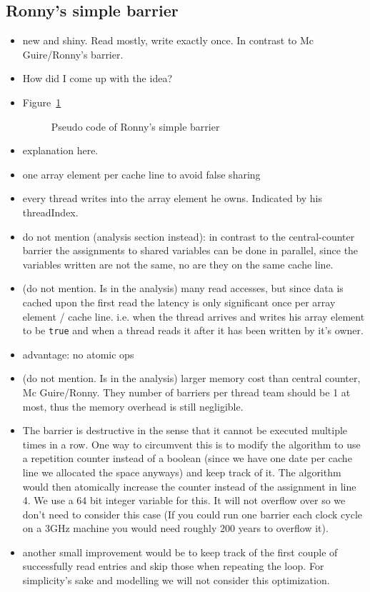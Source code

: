 \documentclass[a4paper, 10pt]{article}
\begin{document}
\begin{enumerate}
\subsection{Ronny's simple barrier}
\label{ssec:new-simple}
\begin{itemize}
	\item new and shiny. Read mostly, write exactly once. In contrast to Mc Guire/Ronny's barrier.
	\item How did I come up with the idea?
	\item Figure~\ref{fig:ronny-simple-no-reset}
		\begin{figure}[htbp]
			\centering
			
			\caption{Pseudo code of Ronny's simple barrier}
			\label{fig:ronny-simple-no-reset}
		\end{figure}
	\item explanation here.
	\item one array element per cache line to avoid false sharing\cite{falsesharing}
	\item every thread writes into the array element he owns. Indicated by his threadIndex.
	\item do not mention (analysis section instead): in contrast to the central-counter barrier the assignments to shared variables can be done in parallel, since the variables written are not the same, no are they on the same cache line.
	\item (do not mention. Is in the analysis) many read accesses, but since data is cached upon the first read the latency is only significant once per array element / cache line. i.e. when the thread arrives and writes his array element to be \texttt{true} and when a thread reads it after it has been written by it's owner.
	\item advantage: no atomic ops
	\item (do not mention. Is in the analysis) larger memory cost than central counter, Mc Guire/Ronny. They number of barriers per thread team should be 1 at most, thus the memory overhead is still negligible.
	\item The barrier is destructive in the sense that it cannot be executed multiple times in a row. One way to circumvent this is to modify the algorithm to use a repetition counter instead of a boolean (since we have one date per cache line we allocated the space anyways) and keep track of it. The algorithm would then atomically increase the counter instead of the assignment in line 4. We use a 64 bit integer variable for this. It will not overflow over so we don't need to consider this case (If you could run one barrier each clock cycle on a 3GHz machine you would need roughly 200 years to overflow it).
	\item another small improvement would be to keep track of the first couple of successfully read entries and skip those when repeating the loop. For simplicity's sake and modelling we will not consider this optimization.
\end{itemize}


\end{enumerate}
\end{document}
